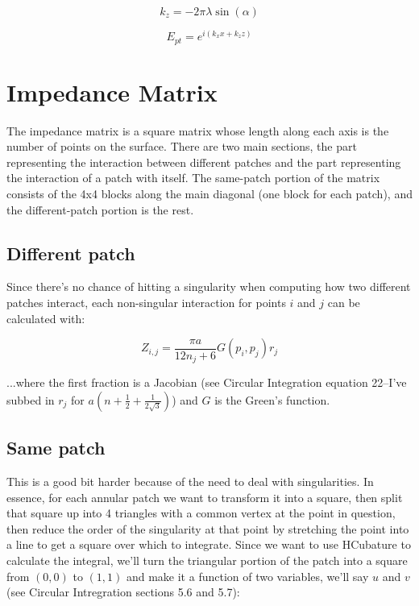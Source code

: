 \documentclass[etd,twoside,senior]{BYUPhys}
\begin{document}
\begin{equation}
  k_{z}=-2\pi\lambda\sin\left(\alpha\right)
\end{equation}

\begin{equation}
  E_{pt}=e^{i\left(k_{x}x+k_{z}z\right)}
\end{equation}



\section{Impedance Matrix} \label{sec:impedance}

The impedance matrix is a square matrix whose length along each axis is the number of points on the surface. There are two main sections, the part representing the interaction between different patches and the part representing the interaction of a patch with itself. The same-patch portion of the matrix consists of the 4x4 blocks along the main diagonal (one block for each patch), and the different-patch portion is the rest.

\subsection{Different patch} \label{sec:different_patch}

Since there's no chance of hitting a singularity when computing how two different patches interact, each non-singular interaction for points $i$ and $j$ can be calculated with:

\begin{equation}
  Z_{i,j}=\frac{\pi a}{12n_{j}+6}G\left(p_{i},p_{j}\right)r_{j}
\end{equation}

...where the first fraction is a Jacobian (see Circular Integration equation 22--I've subbed in $r_{j}$ for $a\left(n+\frac{1}{2}+\frac{1}{2\sqrt{3}}\right)$) and $G$ is the Green's function.

\subsection{Same patch} \label{sec:same_patch}
This is a good bit harder because of the need to deal with singularities. In essence, for each annular patch we want to transform it into a square, then split that square up into 4 triangles with a common vertex at the point in question, then reduce the order of the singularity at that point by stretching the point into a line to get a square over which to integrate. Since we want to use HCubature to calculate the integral, we'll turn the triangular portion of the patch into a square from $(0,0)$ to $(1,1)$ and make it a function of two variables, we'll say $u$ and $v$ (see Circular Intregration sections 5.6 and 5.7):
\end{document}

